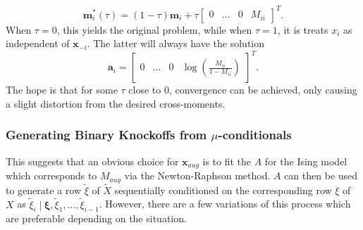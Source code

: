 \documentclass[11pt]{article}
\newcommand{\st}{ \; \big | \:}
\theoremstyle{definition}
\begin{document}
    \[\mathbf m_i^*(\tau) = (1-\tau)\mathbf m_i + \tau \left[ \begin{array}{cccc} 0 & \ldots & 0 & M_{ii} \end{array} \right]^T .\]
            When $\tau=0$, this yields the original problem, while when $\tau=1$, it is treats $x_i$ as independent of $\mathbf x_{-i}$. The latter will always have the solution
            \[\mathbf a_i = \left[ \begin{array}{cccc} 0 & \ldots & 0 & \log\left(\frac{M_{ii}}{1-M_{ii}}\right) \end{array} \right]^T.\]
            The hope is that for some $\tau$ close to $0$, convergence can be achieved, only causing a slight distortion from the desired cross-moments.

\subsubsection{Generating Binary Knockoffs from $\mu$-conditionals}
This suggests that an obvious choice for $\mathbf{x}_{aug}$ is to fit the $A$ for the Ising model which corresponds to $M_{aug}$ via the Newton-Raphson method. $A$ can then be used to generate a row $\tilde \xi$ of $\tilde X$ sequentially conditioned on the corresponding row $\xi$ of $X$ as $\tilde \xi_i \st \mathbf \xi,\tilde \xi_1,\ldots,\tilde \xi_{i-1}$. However, there are a few variations of this process which are preferable depending on the situation. 
\end{document}
